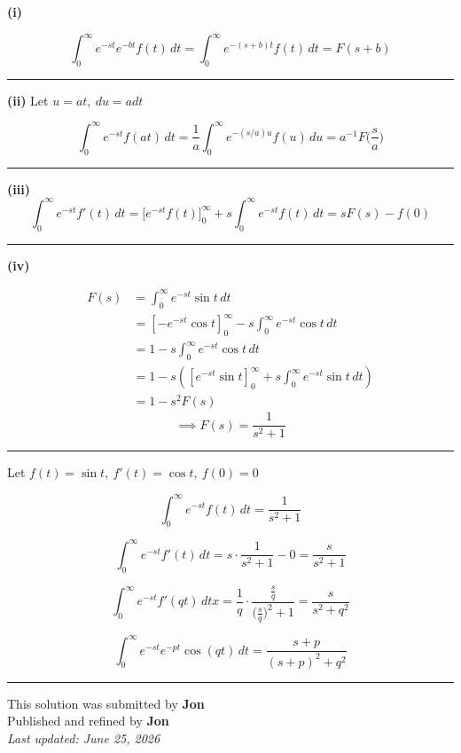 \documentclass[12pt]{article}
\begin{document}
\newcommand{\ds}{\displaystyle}

\textbf{(i)}

$$\int_0^\infty e^{-st}e^{-bt}f(t)\,dt
=\int_0^\infty e^{-(s+b)t}f(t)\,dt=F(s+b)$$

\bigskip\hrule\bigskip

\textbf{(ii)} Let $u=at, \ du = a dt$

$$\int_0^\infty e^{-st}f(at)\,dt
=\frac1a\int_0^\infty e^{-(s/a)u}f(u)\,du
=a^{-1}F\bigl(\frac{s}{a}\bigr)$$

\bigskip\hrule\bigskip

\textbf{(iii)}
$$\int_0^\infty e^{-st}f'(t)\,dt=\bigl[e^{-st}f(t)\bigr]_0^\infty+s\int_0^\infty e^{-st}f(t)\,dt=sF(s)-f(0)$$

\bigskip\hrule\bigskip

\textbf{(iv)}


\begin{align*}
F(s)&=\int_0^\infty e^{-st}\sin t\,dt\\
&=\left[-e^{-st}\cos t\right]_0^\infty-s\int_0^\infty e^{-st}\cos t\,dt\\
&=1-s\int_0^\infty e^{-st}\cos t\,dt\\
&=1-s\left(\left[e^{-st}\sin t\right]_0^\infty+s\int_0^\infty e^{-st}\sin t\,dt\right)\\
&=1-s^2F(s)
\end{align*}
$$\implies \boxed{F(s)=\frac1{s^2+1}}$$


\bigskip\hrule\bigskip
Let $f(t)=\sin t, \ f'(t)=\cos t,\  f(0)=0$

$$\int_0^\infty e^{-st}f(t) \,dt=\frac1{s^2+1}$$

$$\int_0^\infty e^{-st} f'(t)\,dt=s\cdot\frac1{s^2+1}-0=\frac{s}{s^2+1}$$

$$\int_0^\infty e^{-st}f'(qt)\,dtx=\frac1q\cdot\frac{\frac{s}{q}}{\bigl(\frac{s}{q}\bigr)^2+1}=\frac{s}{s^2+q^2}$$

$$\int_0^\infty e^{-st}e^{-pt}\cos(qt)\,dt=\frac{s+p}{(s+p)^2+q^2}$$

\bigskip
\hrule
\begin{center}
    This solution was submitted by \textbf{Jon}\\[4pt]
    Published and refined by \textbf{Jon}\\[8pt]
    \textit{Last updated: June 25, 2026}
\end{center}
\end{document}
